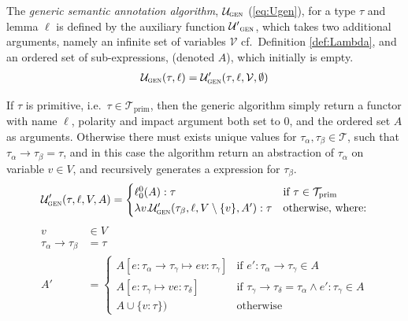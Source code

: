 \begin{definition}
	The \emph{generic semantic annotation algorithm}, $\mathcal{U}_\textsc{gen}$ (\ref{eq:Ugen}), for a type $\tau$ and lemma $\ell$ is defined by the auxiliary function $\mathcal{U'}_\textsc{gen}$, which takes two additional arguments, namely an infinite set of variables $\mathcal{V}$ cf.\ Definition \ref{def:Lambda}, and an ordered set of sub-expressions, (denoted $A$), which initially is empty.
\begin{align}
	\mathcal{U}_\textsc{gen}(\tau, \ell) = \mathcal{U}'_\textsc{gen}(\tau, \ell, \mathcal{V}, \emptyset)
	\label{eq:Ugen}
\end{align}

If $\tau$ is primitive, i.e.\ $\tau \in \mathcal{T}_\mathrm{prim}$, then the generic algorithm simply return a functor with name $\ell$, polarity and impact argument both set to $0$, and the ordered set $A$ as arguments. Otherwise there must exists unique values for $\tau_\alpha, \tau_\beta \in \mathcal{T}$, such that $\tau_\alpha \to \tau_\beta = \tau$, and in this case the algorithm return an abstraction of $\tau_\alpha$ on variable $v \in V$, and recursively generates a expression for $\tau_\beta$.
\begin{align*}
	\mathcal{U}'_\textsc{gen}(\tau, \ell,V,A) =
	\begin{cases}
	 \ell_0^0(A) : \tau	&\text{if $\tau \in \mathcal{T}_\mathrm{prim}$} \\	
	 \lambda v . \mathcal{U}'_\textsc{gen}(\tau_\beta, \ell, V \setminus \{v \}, A') : \tau
	&\text{otherwise, where:} %
	\end{cases}
\end{align*}
\begin{align*}
	v &\in V\\
	\tau_\alpha \to \tau_\beta &= \tau\\
	A' &=
	\begin{cases}
    A [e : \tau_\alpha \to \tau_\gamma \mapsto e v : \tau_\gamma ] & \text{if $e' : \tau_\alpha \to \tau_\gamma \in A$} \\ %
    A [e : \tau_\gamma \mapsto v e : \tau_\delta ] & \text{if $\tau_\gamma \to \tau_\delta = \tau_\alpha \wedge e' : \tau_\gamma \in A$}\\
    A \cup \{v : \tau\}) & \text{otherwise}
	\end{cases}
\end{align*}

\end{definition}
